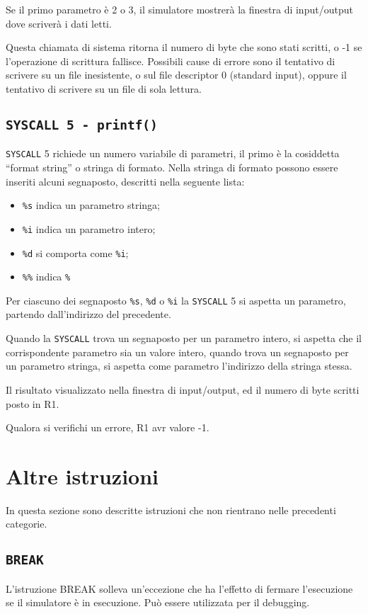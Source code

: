 \documentclass[12pt]{report}
\newcommand{\SC}{\texttt{SYSCALL}}
\begin{document}
Se il primo parametro \`{e} 2 o 3, il simulatore mostrer\`{a} la finestra di input/output dove scriver\`{a} i dati letti.

Questa chiamata di sistema ritorna il numero di byte che sono stati scritti, o -1 se l'operazione di scrittura fallisce. 
Possibili cause di errore sono il tentativo di scrivere su un file inesistente, o sul file descriptor 0 (standard input), 
oppure il tentativo di scrivere su un file di sola lettura.

\label{sys5}
\subsection{\texttt{SYSCALL 5 - printf()}}
\SC{} 5 richiede un numero variabile di parametri, il primo \`{e} la cosiddetta
``format string'' o stringa di formato. Nella stringa di formato possono essere inseriti alcuni segnaposto,
descritti nella seguente lista:
\begin{itemize}
	\item \texttt{\%s} indica un parametro stringa;
	\item \texttt{\%i} indica un parametro intero;
	\item \texttt{\%d} si comporta come \texttt{\%i};
	\item \texttt{\%\%} indica \texttt{\%}
\end{itemize}

Per ciascuno dei segnaposto \texttt{\%s}, \texttt{\%d} o \texttt{\%i} la \SC{} 5
si aspetta un parametro, partendo dall'indirizzo del precedente.

Quando la \SC{} trova un segnaposto per un parametro intero, si aspetta che
il corrispondente parametro sia un valore intero, quando trova un segnaposto per un 
parametro stringa, si aspetta come parametro l'indirizzo della stringa stessa.

Il risultato  visualizzato nella finestra di input/output, ed il numero di byte scritti 
 posto in R1.

Qualora si verifichi un errore, R1 avr valore -1.

\section{Altre istruzioni}
In questa sezione sono descritte istruzioni che non rientrano nelle precedenti categorie.
\subsection{\texttt{BREAK}}
L'istruzione BREAK solleva un'eccezione che ha l'effetto di fermare l'esecuzione 
se il simulatore \`{e} in esecuzione. Pu\`{o} essere utilizzata per il debugging.
\end{document}
